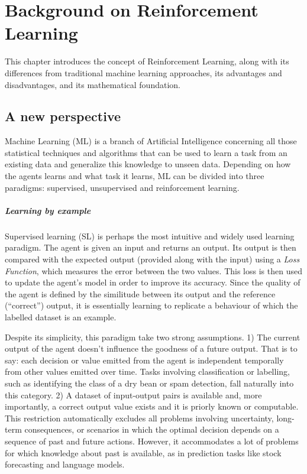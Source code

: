 \chapter{Background on Reinforcement Learning}

This chapter introduces the concept of Reinforcement Learning, along with its differences from traditional machine learning approaches, its advantages and disadvantages, and its mathematical foundation.

\section{A new perspective}

Machine Learning (ML) is a branch of Artificial Intelligence concerning all those statistical techniques and algorithms that can be used to learn a task from an existing data and generalize this knowledge to unseen data. Depending on how the agents learns and what task it learns, ML can be divided into three paradigms: supervised, unsupervised and reinforcement learning.

\paragraph{Learning by example}

Supervised learning (SL) is perhaps the most intuitive and widely used learning paradigm.
The agent is given an input and returns an output. Its output is then compared with the expected output (provided along with the input) using a \textit{Loss Function}, which measures the error between the two values.
This loss is then used to update the agent's model in order to improve its accuracy.
Since the quality of the agent is defined by the similitude between its output and the reference (``correct'') output, it is essentially learning to replicate a behaviour of which the labelled dataset is an example.

Despite its simplicity, this paradigm take two strong assumptions.
1) The current output of the agent doesn't influence the goodness of a future output. That is to say: each decision or value emitted from the agent is independent temporally from other values emitted over time.
Tasks involving classification or labelling, such as identifying the class of a dry bean or spam detection, fall naturally into this category.
2) A dataset of input-output pairs is available and, more importantly, a correct output value exists and it is priorly known or computable. This restriction automatically excludes all problems involving uncertainty, long-term consequences, or scenarios in which the optimal decision depends on a sequence of past and future actions. However, it accommodates a lot of problems for which knowledge about past is available, as in prediction tasks like stock forecasting and language models.

